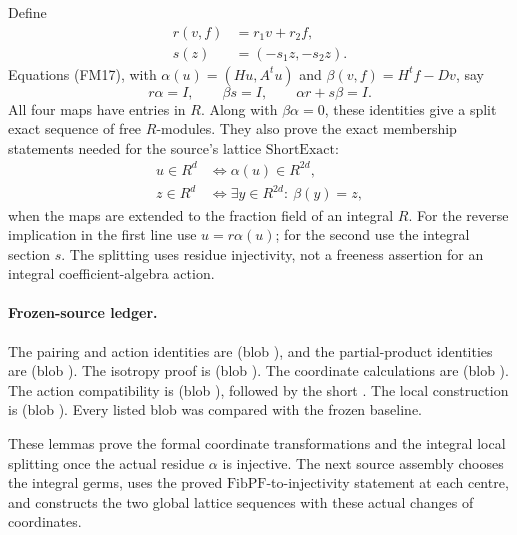 Define
\[
 \begin{split}
 r(v,f)&=r_1v+r_2f,\\
 s(z)&=(-s_1z,-s_2z).
 \end{split}
\]
Equations (FM17), with
\(\alpha(u)=(Hu,A^tu)\) and
\(\beta(v,f)=H^tf-Dv\), say
\[
                    r\alpha=I,\qquad \beta s=I,\qquad
                             \alpha r+s\beta=I.
 \tag{FM18}\label{eq:faithful-local-split-maps}
\]
All four maps have entries in \(R\).
Along with \(\beta\alpha=0\), these identities give
a split exact sequence of free \(R\)-modules.
They also prove the exact membership statements needed
for the source's lattice \(\mathrm{ShortExact}\):
\[
 \begin{split}
 u\in R^d
   &\iff \alpha(u)\in R^{2d},\\
 z\in R^d
   &\iff \exists y\in R^{2d}:\ \beta(y)=z,
 \end{split}
\]
when the maps are extended to the fraction field of
an integral \(R\).
For the reverse implication in the first line use
\(u=r\alpha(u)\); for the second use the integral
section \(s\).
The splitting uses residue injectivity, not a
freeness assertion for an integral coefficient-algebra action.

\paragraph{Frozen-source ledger.}
The pairing and action identities are
(blob ),
and the partial-product identities are
(blob ).
The isotropy proof is
(blob ).
The coordinate calculations are
(blob ).
The action compatibility is
(blob ),
followed by the short
.
The local construction is
(blob ).
Every listed blob was compared with the frozen baseline.

These lemmas prove the formal coordinate transformations
and the integral local splitting once the actual residue
\(\alpha\) is injective.
The next source assembly chooses the integral germs,
uses the proved \(\mathrm{FibPF}\)-to-injectivity statement
at each centre, and constructs the two global lattice
sequences with these actual changes of coordinates.

